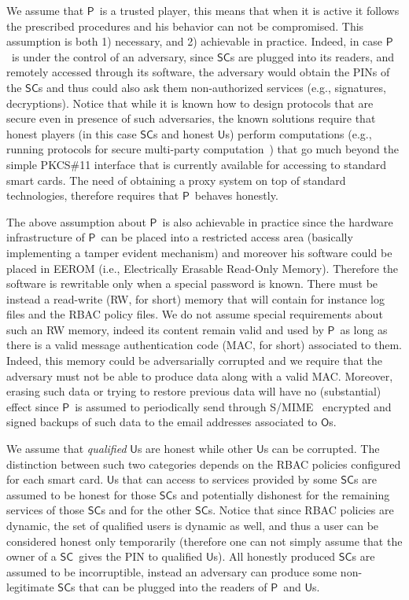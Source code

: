 \documentclass[preprint,authoryear,12pt]{elsarticle}
\newcommand{\Owner}{\ensuremath{\mathsf{O}}}
\newcommand{\User}{\ensuremath{\mathsf{U}}}
\newcommand{\Proxy}{\ensuremath{\mathsf{P}}}
\newcommand{\SC}{\ensuremath{\mathsf{SC}}}
\begin{document}
We assume that \Proxy\ is a trusted player, this means that when it is active it follows the prescribed procedures and his behavior can not be compromised. This assumption is both 1) necessary, and 2) achievable in practice.
Indeed, in case \Proxy\ is under the control of an adversary, since \SC s are plugged into its readers, and remotely accessed through its software, the adversary would obtain the PINs of the \SC s and thus could also ask them non-authorized services (e.g., signatures, decryptions). Notice that while it is known how to design protocols that are secure even in presence of such adversaries, the known solutions require that honest players (in this case \SC s and honest \User s) perform computations (e.g., running protocols for secure multi-party computation~\cite{GMW87}) 
that go much beyond the simple PKCS\#11 interface that is currently available for accessing to standard smart cards. The need of obtaining a proxy system on top of standard technologies, therefore requires
that \Proxy\ behaves honestly.

The above assumption about \Proxy\ is also achievable in practice since the hardware infrastructure of \Proxy\ can be placed into a restricted access area (basically implementing a tamper evident mechanism) and moreover his software could be placed in EEROM (i.e., Electrically Erasable Read-Only Memory). Therefore
the software is rewritable only when a special password is known. There must be instead a read-write (RW, for short) memory that will contain for instance log files and the RBAC policy files. We do not assume special requirements about such an RW memory, indeed its content remain valid and used by \Proxy\ as long as there is a valid message authentication code (MAC, for short) associated to them. Indeed, this memory could be adversarially corrupted and we require that the adversary must not be
able to produce data along with a valid MAC. Moreover, erasing such data or trying to restore previous data will have no (substantial) effect since \Proxy\ is assumed to periodically send through S/MIME~\citep{smime} encrypted and signed backups of such data to the email addresses associated to \Owner s.

We assume that {\em qualified} \User s are honest while other \User s can be corrupted. The distinction between such two categories depends on the RBAC policies configured for each smart card. \User s that can access to services provided by some \SC s are assumed to be honest for those \SC s and potentially dishonest for the remaining services of those \SC s and for the other \SC s. Notice that since RBAC policies are dynamic, the set of qualified users is dynamic as well, and thus a user can be considered honest only temporarily (therefore one can not simply assume that the owner of a \SC\ gives the PIN to qualified \User s).
All honestly produced \SC s are assumed to be incorruptible, instead an adversary can produce some non-legitimate \SC s that can be plugged into the readers of \Proxy\ and \User s.
\end{document}
